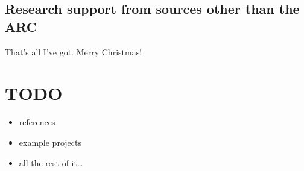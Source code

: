 \documentclass[a4paper,fontsize=12pt]{scrartcl}
\begin{document}
\newpage
\setcounter{section}{7} %
\setcounter{subsection}{0}
\subsection{Research support from sources other than the ARC}
\label{sec:other-research-support}

That's all I've got. Merry Christmas!

\section{TODO}
\label{sec:todo}

\begin{itemize}
\item references
\item example projects
\item all the rest of it\ldots
\end{itemize}



\printbibliography[title=References]
\end{document}

